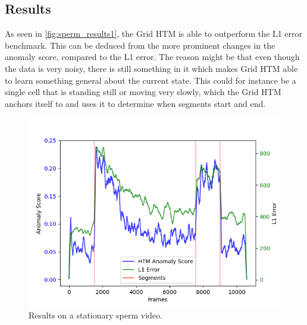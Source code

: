 \subsection{Results}
As seen in \autoref{fig:sperm_results1}, the Grid HTM is able to outperform the L1 error benchmark. This can be deduced from the more prominent changes in the anomaly score, compared to the L1 error. The reason might be that even though the data is very noisy, there is still something in it which makes Grid HTM able to learn something general about the current state. This could for instance be a single cell that is standing still or moving very slowly, which the Grid HTM anchors itself to and uses it to determine when segments start and end.
\begin{figure}[H]
    \centering
    \includegraphics[width=\textwidth]{resources/experiments/sperm/sperm_result1.png}
    \caption{Results on a stationary sperm video.}
    \label{fig:sperm_results1}
\end{figure}

